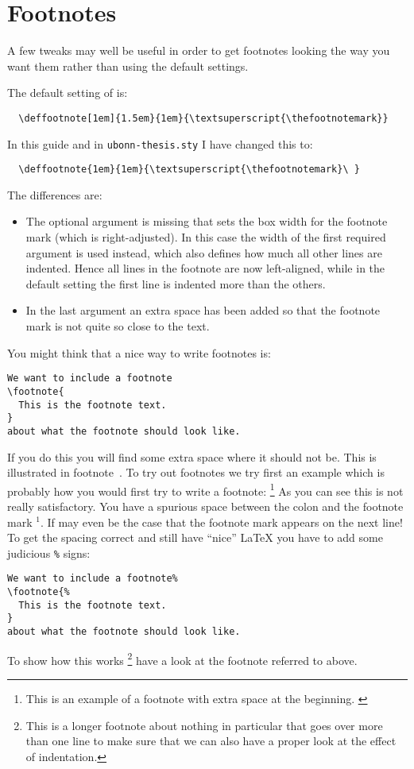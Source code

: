 \section{Footnotes}%
\label{sec:layout:footnote}

A few tweaks may well be useful in order to get footnotes looking the
way you want them rather than using the default \KOMAScript{}
settings.

The default setting of \KOMAScript{} is:
\begin{verbatim}
  \deffootnote[1em]{1.5em}{1em}{\textsuperscript{\thefootnotemark}}
\end{verbatim}
In this guide and in \texttt{ubonn-thesis.sty} I have changed this to:
\begin{verbatim}
  \deffootnote{1em}{1em}{\textsuperscript{\thefootnotemark}\ }
\end{verbatim}
The differences are:
\begin{itemize}
\item The optional argument is missing that sets the box width for the
  footnote mark (which is right-adjusted). In this case the width of
  the first required argument is used instead, which also defines how
  much all other lines are indented. Hence all lines in the footnote
  are now left-aligned, while in the default setting the first line is
  indented more than the others.
\item In the last argument an extra space has been added so that the
  footnote mark is not quite so close to the text.
\end{itemize}

You might think that a nice way to write footnotes is:
\begin{verbatim}
We want to include a footnote
\footnote{
  This is the footnote text.
}
about what the footnote should look like.
\end{verbatim}
If you do this you will find some extra space where it should not be.
This is illustrated in footnote~.
To try out footnotes we try first an example which is probably how you
would first try to write a footnote:
\footnote{
  This is an example of a footnote with extra space at the beginning.%
  \label{foot:short}
}
As you can see this is not really satisfactory. You have a spurious
space between the colon and the footnote mark \(^{1}\). If may even
be the case that the footnote mark appears on the next line! To get the spacing
correct and still have \enquote{nice} \LaTeX{} you have to add some
judicious \texttt{\%} signs:
\begin{verbatim}
We want to include a footnote%
\footnote{%
  This is the footnote text.
}
about what the footnote should look like.
\end{verbatim}
To show how this works%
\footnote{\label{foot:long}%
  This is a longer footnote about nothing in particular that goes
  over more than one line to make sure that we can also have a proper
  look at the effect of indentation.}
have a look at the footnote referred to above.

